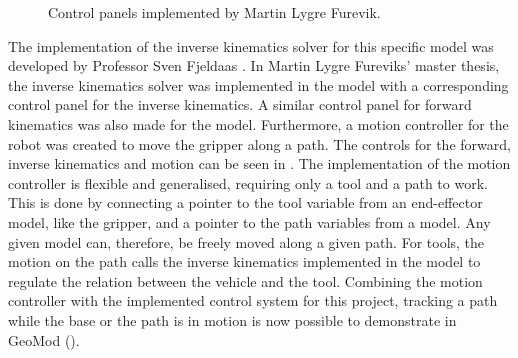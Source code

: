 \begin{figure}[ht]
  \centering
  \hfill
  \hfill
  \caption[Control panels implemented by Martin Lygre Furevik]{Control panels implemented by Martin Lygre Furevik.}
  \label{fig:martincontrolpanels}
\end{figure}

The implementation of the inverse kinematics solver for this specific model was developed by Professor Sven Fjeldaas \cite{sven}. In Martin Lygre Fureviks' master thesis, the inverse kinematics solver was implemented in the model with a corresponding control panel for the inverse kinematics. A similar control panel for forward kinematics was also made for the model. Furthermore, a motion controller for the robot was created to move the gripper along a path. The controls for the forward, inverse kinematics and motion can be seen in . The implementation of the motion controller is flexible and generalised, requiring only a tool and a path to work. This is done by connecting a pointer to the tool variable from an end-effector model, like the gripper, and a pointer to the path variables from a model. Any given model can, therefore, be freely moved along a given path. For tools, the motion on the path calls the inverse kinematics implemented in the model to regulate the relation between the vehicle and the tool. Combining the motion controller with the implemented control system for this project, tracking a path while the base or the path is in motion is now possible to demonstrate in GeoMod (). 



